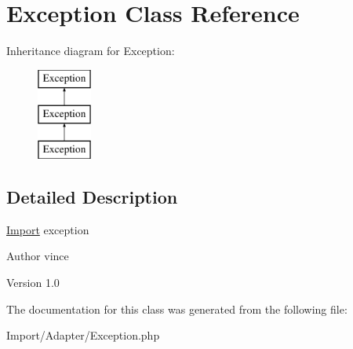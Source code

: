 \hypertarget{class_anemo_1_1_import_1_1_adapter_1_1_exception}{
\section{Exception Class Reference}
\label{class_anemo_1_1_import_1_1_adapter_1_1_exception}
}
Inheritance diagram for Exception:\begin{figure}[H]
\begin{center}
\leavevmode
\includegraphics[height=3.000000cm]{class_anemo_1_1_import_1_1_adapter_1_1_exception}
\end{center}
\end{figure}


\subsection{Detailed Description}
\hyperlink{class_anemo_1_1_import}{Import} exception \begin{DoxyAuthor}{Author}
vince 
\end{DoxyAuthor}
\begin{DoxyVersion}{Version}
1.0 
\end{DoxyVersion}


The documentation for this class was generated from the following file:\begin{DoxyCompactItemize}
\item 
Import/Adapter/Exception.php\end{DoxyCompactItemize}
